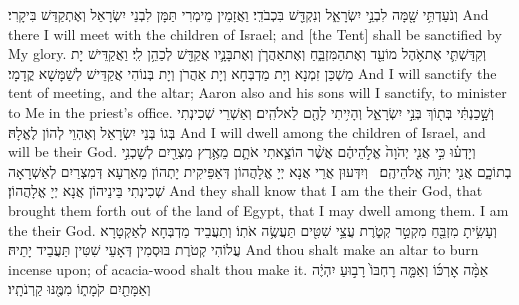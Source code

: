 {וְנֹעַדְתִּ֥י שָׁ֖מָּה לִבְנֵ֣י יִשְׂרָאֵ֑ל וְנִקְדַּ֖שׁ בִּכְבֹדִֽי׃}
{וַאֲזָמֵין מֵימְרִי תַּמָּן לִבְנֵי יִשְׂרָאֵל וְאֶתְקַדַּשׁ בִּיקָרִי׃}
{And there I will meet with the children of Israel; and [the Tent] shall be sanctified by My glory.}{}
{וְקִדַּשְׁתִּ֛י אֶת\maqqaf אֹ֥הֶל מוֹעֵ֖ד וְאֶת\maqqaf הַמִּזְבֵּ֑חַ וְאֶת\maqqaf אַהֲרֹ֧ן וְאֶת\maqqaf בָּנָ֛יו אֲקַדֵּ֖שׁ לְכַהֵ֥ן לִֽי׃}
{וַאֲקַדֵּישׁ יָת מַשְׁכַּן זִמְנָא וְיָת מַדְבְּחָא וְיָת אַהֲרֹן וְיָת בְּנוֹהִי אֲקַדֵּישׁ לְשַׁמָּשָׁא קֳדָמָי׃}
{And I will sanctify the tent of meeting, and the altar; Aaron also and his sons will I sanctify, to minister to Me in the priest’s office.}{}
{וְשָׁ֣כַנְתִּ֔י בְּת֖וֹךְ בְּנֵ֣י יִשְׂרָאֵ֑ל וְהָיִ֥יתִי לָהֶ֖ם לֵאלֹהִֽים׃}
{וְאַשְׁרֵי שְׁכִינְתִי בְּגוֹ בְּנֵי יִשְׂרָאֵל וְאֶהְוֵי לְהוֹן לֶאֱלָהּ׃}
{And I will dwell among the children of Israel, and will be their God.}{}
{וְיָדְע֗וּ כִּ֣י אֲנִ֤י יְהֹוָה֙ אֱלֹ֣הֵיהֶ֔ם אֲשֶׁ֨ר הוֹצֵ֧אתִי אֹתָ֛ם מֵאֶ֥רֶץ מִצְרַ֖יִם לְשׇׁכְנִ֣י בְתוֹכָ֑ם אֲנִ֖י יְהֹוָ֥ה אֱלֹהֵיהֶֽם׃ \petucha }
{וְיִדְּעוּן אֲרֵי אֲנָא יְיָ אֱלָהֲהוֹן דְּאַפֵּיקִית יָתְהוֹן מֵאַרְעָא דְּמִצְרַיִם לְאַשְׁרָאָה שְׁכִינְתִי בֵּינֵיהוֹן אֲנָא יְיָ אֱלָהֲהוֹן׃}
{And they shall know that I am the \lord\space their God, that brought them forth out of the land of Egypt, that I may dwell among them. I am the \lord\space their God.}{}
\newperek
{}
{וְעָשִׂ֥יתָ מִזְבֵּ֖חַ מִקְטַ֣ר קְטֹ֑רֶת עֲצֵ֥י שִׁטִּ֖ים תַּעֲשֶׂ֥ה אֹתֽוֹ׃}
{וְתַעֲבֵיד מַדְבְּחָא לְאַקְטָרָא עֲלוֹהִי קְטֹרֶת בּוּסְמִין דְּאָעֵי שִׁטִּין תַּעֲבֵיד יָתֵיהּ׃}
{And thou shalt make an altar to burn incense upon; of acacia-wood shalt thou make it.}{}
{אַמָּ֨ה אׇרְכּ֜וֹ וְאַמָּ֤ה רׇחְבּוֹ֙ רָב֣וּעַ יִהְיֶ֔ה וְאַמָּתַ֖יִם קֹמָת֑וֹ מִמֶּ֖נּוּ קַרְנֹתָֽיו׃}
